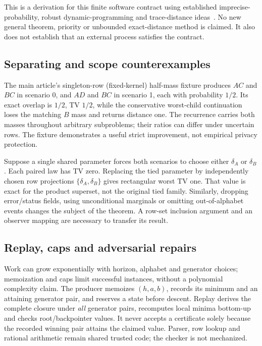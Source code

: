 \documentclass[11pt,a4paper]{article}
\begin{document}
This is a derivation for this finite software contract using established imprecise-probability, robust dynamic-programming and trace-distance ideas~\cite{cooman,tzortzis,chen,bian}. No new general theorem, priority or unbounded exact-distance method is claimed. It also does not establish that an external process satisfies the contract.

\subsection{Separating and scope counterexamples}
The main article's singleton-row (fixed-kernel) half-mass fixture produces $AC$ and $BC$ in scenario 0, and $AD$ and $BC$ in scenario 1, each with probability $1/2$. Its exact overlap is $1/2$, TV $1/2$, while the conservative worst-child continuation loses the matching $B$ mass and returns distance one. The recurrence carries both masses throughout arbitrary subproblems; their ratios can differ under uncertain rows. The fixture demonstrates a useful strict improvement, not empirical privacy protection.

Suppose a single shared parameter forces both scenarios to choose either $\delta_A$ or $\delta_B$. Each paired law has TV zero. Replacing the tied parameter by independently chosen row projections $\{\delta_A,\delta_B\}$ gives rectangular worst TV one. That value is exact for the product superset, not the original tied family. Similarly, dropping error/status fields, using unconditional marginals or omitting out-of-alphabet events changes the subject of the theorem. A row-set inclusion argument and an observer mapping are necessary to transfer its result.

\subsection{Replay, caps and adversarial repairs}
Work can grow exponentially with horizon, alphabet and generator choices; memoization and caps limit successful instances, without a polynomial complexity claim. The producer memoizes $(h,a,b)$, records its minimum and an attaining generator pair, and reserves a state before descent. Replay derives the complete closure under \emph{all} generator pairs, recomputes local minima bottom-up and checks root/backpointer values. It never accepts a certificate solely because the recorded winning pair attains the claimed value. Parser, row lookup and rational arithmetic remain shared trusted code; the checker is not mechanized.
\end{document}
